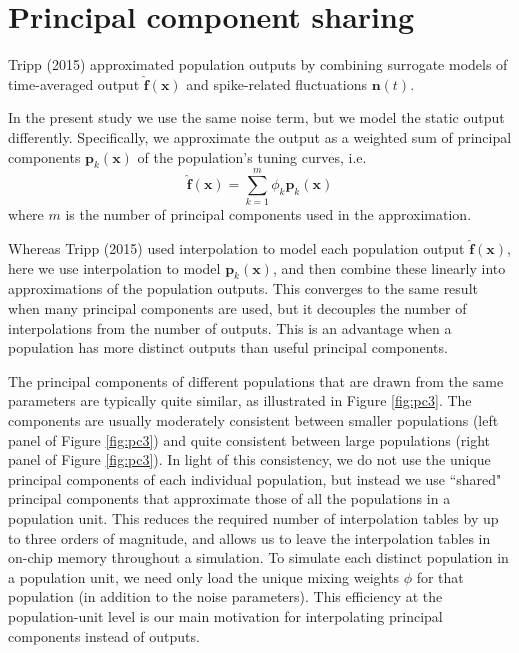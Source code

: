 \documentclass[]{article}
\begin{document}
\section{Principal component sharing}

Tripp (2015) approximated population outputs by combining surrogate models of time-averaged output $\hat{\mathbf{f}}(\mathbf{x})$ and spike-related fluctuations $\mathbf{n}(t)$. 

In the present study we use the same noise term, but we model the static output differently. Specifically, we approximate the output as a weighted sum of principal components $\mathbf{p}_k(\mathbf{x})$ of the population's tuning curves, i.e.
\begin{equation}
\hat{\mathbf{f}}(\mathbf{x}) =  \sum_{k=1}^m \phi_k \mathbf{p}_k(\mathbf{x})
\end{equation}
where $m$ is the number of principal components used in the approximation. 

Whereas Tripp (2015) used interpolation to model each population output $\hat{\mathbf{f}}(\mathbf{x})$, here we use interpolation to model $\mathbf{p}_k(\mathbf{x})$, and then combine these linearly into approximations of the population outputs. This converges to the same result when many principal components are used, but it  
decouples the number of interpolations from the number of outputs. This is an advantage when a population has more distinct outputs than useful principal components. 

The principal components of different populations that are drawn from the same parameters are typically quite similar, as illustrated in Figure \ref{fig:pc3}. The components are usually moderately consistent between smaller populations (left panel of Figure \ref{fig:pc3}) and quite consistent between large populations (right panel of Figure \ref{fig:pc3}). In light of this consistency, we do not use the unique principal components of each individual population, but instead we use ``shared" principal components that approximate those of all the populations in a population unit. This reduces the required number of interpolation tables by up to three orders of magnitude, and allows us to leave the interpolation tables in on-chip memory throughout a simulation. To simulate each distinct population in a population unit, we need only load the unique mixing weights $\phi$ for that population (in addition to the noise parameters). This efficiency at the population-unit level is our main motivation for interpolating principal components instead of outputs. 
\end{document}
